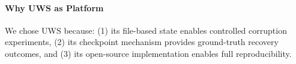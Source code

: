 \paragraph{Why UWS as Platform} We chose UWS because: (1) its file-based state enables controlled corruption experiments, (2) its checkpoint mechanism provides ground-truth recovery outcomes, and (3) its open-source implementation enables full reproducibility.
